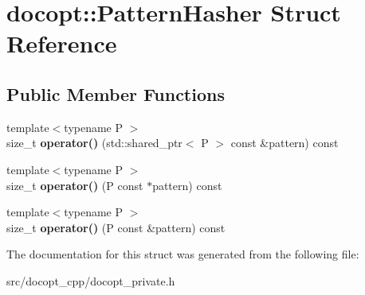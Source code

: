 \hypertarget{structdocopt_1_1PatternHasher}{}\section{docopt\+:\+:Pattern\+Hasher Struct Reference}
\label{structdocopt_1_1PatternHasher}
\subsection*{Public Member Functions}
\begin{DoxyCompactItemize}
\item 
\mbox{\label{structdocopt_1_1PatternHasher_a1710a6bd411652415e3fb887f543a59e}} 
{\footnotesize template$<$typename P $>$ }\\size\+\_\+t {\bfseries operator()} (std\+::shared\+\_\+ptr$<$ P $>$ const \&pattern) const
\item 
\mbox{\label{structdocopt_1_1PatternHasher_a4d2b0b65ac3f809a34557fc4dd35afc2}} 
{\footnotesize template$<$typename P $>$ }\\size\+\_\+t {\bfseries operator()} (P const $\ast$pattern) const
\item 
\mbox{\label{structdocopt_1_1PatternHasher_ab5f6cd063dd6a0c767e8d79e47af4450}} 
{\footnotesize template$<$typename P $>$ }\\size\+\_\+t {\bfseries operator()} (P const \&pattern) const
\end{DoxyCompactItemize}


The documentation for this struct was generated from the following file\+:\begin{DoxyCompactItemize}
\item 
src/docopt\+\_\+cpp/docopt\+\_\+private.\+h\end{DoxyCompactItemize}
